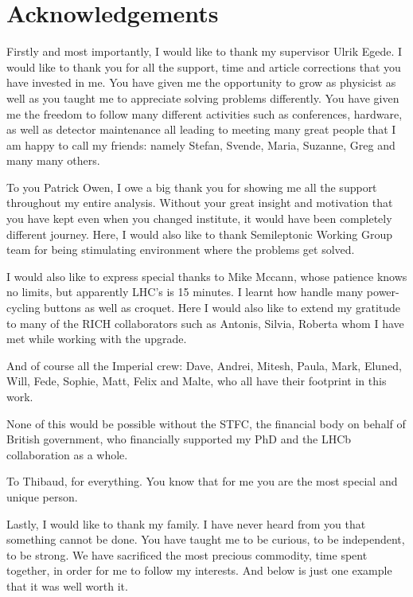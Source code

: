 \chapter*{Acknowledgements}

Firstly and most importantly, I would like to thank my supervisor Ulrik Egede. I would like to thank you for all the support, time and article corrections that you have invested in me. You have given me the opportunity to grow as physicist as well as you taught me to appreciate solving problems differently. You have given me the freedom to follow many different activities such as conferences, hardware, as well as detector maintenance all leading to meeting many great people that I am happy to call my friends: namely Stefan, Svende, Maria, Suzanne, Greg and many many others.

To you Patrick Owen, I owe a big thank you for showing me all the support throughout my entire analysis. Without your great insight and motivation that you have kept even when you changed institute, it would have been completely different journey. Here, I would also like to thank Semileptonic Working Group team for being stimulating environment where the problems get solved.  

I would also like to express special thanks to Mike Mccann, whose patience knows no limits, but apparently LHC's is 15 minutes. I learnt how handle many power-cycling buttons as well as croquet. Here I would also like to extend my gratitude to many of the RICH collaborators such as Antonis, Silvia, Roberta whom I have met while working with the upgrade.

And of course all the Imperial crew: Dave, Andrei, Mitesh, Paula, Mark, Eluned, Will, Fede, Sophie, Matt, Felix and Malte, who all have their footprint in this work.

None of this would be possible without the STFC, the financial body on behalf of British government, who financially supported my PhD and the LHCb collaboration as a whole.

To Thibaud, for everything. You know that for me you are the most special and unique person.

Lastly, I would like to thank my family. I have never heard from you that something cannot be done. You have taught me to be curious, to be independent, to be strong. We have sacrificed the most precious commodity, time spent together, in order for me to follow my interests. And below is just one example that it was well worth it.  


